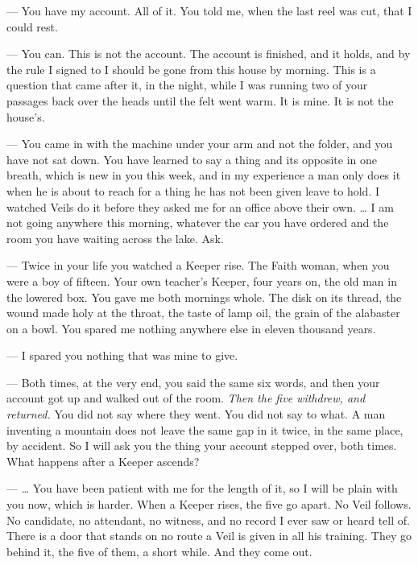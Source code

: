 
\begin{room}

--- You have my account. All of it. You told me, when the last reel was cut, that I could rest.

--- You can. This is not the account. The account is finished, and it holds, and by the rule I signed to I should be gone from this house by morning. This is a question that came after it, in the night, while I was running two of your passages back over the heads until the felt went warm. It is mine. It is not the house's.

--- You came in with the machine under your arm and not the folder, and you have not sat down. You have learned to say a thing and its opposite in one breath, which is new in you this week, and in my experience a man only does it when he is about to reach for a thing he has not been given leave to hold. I watched Veils do it before they asked me for an office above their own. \ldots{} I am not going anywhere this morning, whatever the car you have ordered and the room you have waiting across the lake. Ask.

--- Twice in your life you watched a Keeper rise. The Faith woman, when you were a boy of fifteen. Your own teacher's Keeper, four years on, the old man in the lowered box. You gave me both mornings whole. The disk on its thread, the wound made holy at the throat, the taste of lamp oil, the grain of the alabaster on a bowl. You spared me nothing anywhere else in eleven thousand years.

--- I spared you nothing that was mine to give.

--- Both times, at the very end, you said the same six words, and then your account got up and walked out of the room. \emph{Then the five withdrew, and returned.} You did not say where they went. You did not say to what. A man inventing a mountain does not leave the same gap in it twice, in the same place, by accident. So I will ask you the thing your account stepped over, both times. What happens after a Keeper ascends?

--- \ldots{} You have been patient with me for the length of it, so I will be plain with you now, which is harder. When a Keeper rises, the five go apart. No Veil follows. No candidate, no attendant, no witness, and no record I ever saw or heard tell of. There is a door that stands on no route a Veil is given in all his training. They go behind it, the five of them, a short while. And they come out.


\end{room}
